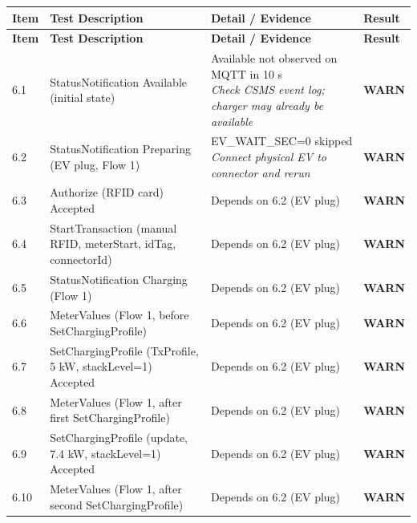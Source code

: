 \documentclass[10pt, a4paper]{article}
\begin{document}
\renewcommand{\arraystretch}{1.35}
\begin{longtable}{|L{1cm}|L{5.5cm}|M{7cm}|C{1.8cm}|}
\hline
{}
\textbf{Item} & \small\textbf{Test Description} & \small\textbf{Detail / Evidence} & \small\textbf{Result} \\
\hline
\endfirsthead
\hline
{}
\textbf{Item} & \small\textbf{Test Description} & \small\textbf{Detail / Evidence} & \small\textbf{Result} \\
\hline
\endhead
\hline
\endfoot
\small 6.1 & \small StatusNotification Available (initial state) & Available not observed on MQTT in 10 s{\newline\normalfont\footnotesize\itshape Check CSMS event log; charger may already be available} & \textcolor{warnorange}{\textbf{WARN}} \\
\hline
\small 6.2 & \small StatusNotification Preparing (EV plug, Flow 1) & EV\_WAIT\_SEC=0  skipped{\newline\normalfont\footnotesize\itshape Connect physical EV to connector and rerun} & \textcolor{warnorange}{\textbf{WARN}} \\
\hline
\small 6.3 & \small Authorize (RFID card)  Accepted & Depends on 6.2 (EV plug) & \textcolor{warnorange}{\textbf{WARN}} \\
\hline
\small 6.4 & \small StartTransaction (manual RFID, meterStart, idTag, connectorId) & Depends on 6.2 (EV plug) & \textcolor{warnorange}{\textbf{WARN}} \\
\hline
\small 6.5 & \small StatusNotification Charging (Flow 1) & Depends on 6.2 (EV plug) & \textcolor{warnorange}{\textbf{WARN}} \\
\hline
\small 6.6 & \small MeterValues (Flow 1, before SetChargingProfile) & Depends on 6.2 (EV plug) & \textcolor{warnorange}{\textbf{WARN}} \\
\hline
\small 6.7 & \small SetChargingProfile (TxProfile, 5 kW, stackLevel=1)  Accepted & Depends on 6.2 (EV plug) & \textcolor{warnorange}{\textbf{WARN}} \\
\hline
\small 6.8 & \small MeterValues (Flow 1, after first SetChargingProfile) & Depends on 6.2 (EV plug) & \textcolor{warnorange}{\textbf{WARN}} \\
\hline
\small 6.9 & \small SetChargingProfile (update, 7.4 kW, stackLevel=1)  Accepted & Depends on 6.2 (EV plug) & \textcolor{warnorange}{\textbf{WARN}} \\
\hline
\small 6.10 & \small MeterValues (Flow 1, after second SetChargingProfile) & Depends on 6.2 (EV plug) & \textcolor{warnorange}{\textbf{WARN}} \\

\end{longtable}
\end{document}
